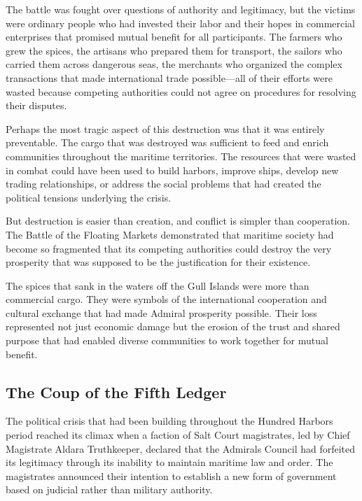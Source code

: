The battle was fought over questions of authority and legitimacy, but
the victims were ordinary people who had invested their labor and their
hopes in commercial enterprises that promised mutual benefit for all
participants. The farmers who grew the spices, the artisans who prepared
them for transport, the sailors who carried them across dangerous seas,
the merchants who organized the complex transactions that made
international trade possible---all of their efforts were wasted because
competing authorities could not agree on procedures for resolving their
disputes.

Perhaps the most tragic aspect of this destruction was that it was
entirely preventable. The cargo that was destroyed was sufficient to
feed and enrich communities throughout the maritime territories. The
resources that were wasted in combat could have been used to build
harbors, improve ships, develop new trading relationships, or address
the social problems that had created the political tensions underlying
the crisis.

But destruction is easier than creation, and conflict is simpler than
cooperation. The Battle of the Floating Markets demonstrated that
maritime society had become so fragmented that its competing authorities
could destroy the very prosperity that was supposed to be the
justification for their existence.

The spices that sank in the waters off the Gull Islands were more than
commercial cargo. They were symbols of the international cooperation and
cultural exchange that had made Admiral prosperity possible. Their loss
represented not just economic damage but the erosion of the trust and
shared purpose that had enabled diverse communities to work together for
mutual benefit.

\subsection{The Coup of the Fifth
Ledger}\label{the-coup-of-the-fifth-ledger}

The political crisis that had been building throughout the Hundred
Harbors period reached its climax when a faction of Salt Court
magistrates, led by Chief Magistrate Aldara Truthkeeper, declared that
the Admiral\textquotesingle s Council had forfeited its legitimacy
through its inability to maintain maritime law and order. The
magistrates announced their intention to establish a new form of
government based on judicial rather than military authority.


